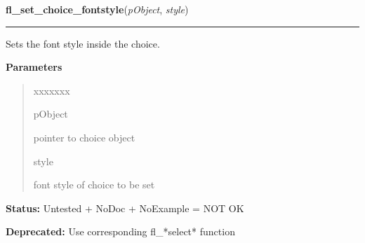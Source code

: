 \hspace{.8\funcindent}\begin{boxedminipage}{\funcwidth}

    \raggedright \textbf{fl\_set\_choice\_fontstyle}(\textit{pObject}, \textit{style})

    \vspace{-1.5ex}

    \rule{\textwidth}{0.5\fboxrule}
\setlength{\parskip}{2ex}
    Sets the font style inside the choice.

\setlength{\parskip}{1ex}
      \textbf{Parameters}
      \vspace{-1ex}

      \begin{quote}
        \begin{Ventry}{xxxxxxx}

          \item[pObject]

          pointer to choice object

          \item[style]

          font style of choice to be set

        \end{Ventry}

      \end{quote}

\textbf{Status:} Untested + NoDoc + NoExample = NOT OK



\textbf{Deprecated:} Use corresponding fl\_*select* function



    \end{boxedminipage}

    \label{xformslib:deprecated:fl_set_choice_align}

    \vspace{0.5ex}

